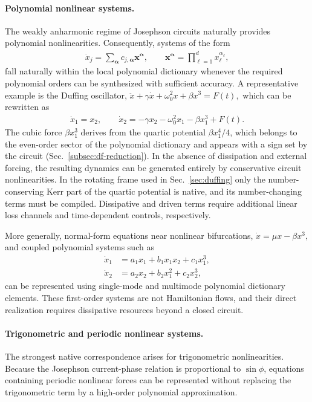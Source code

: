 \documentclass[pra,twocolumn,superscriptaddress,nofootinbib,floatfix]{revtex4-2}
\theoremstyle{remark}
\newcommand{\revcolor}{\color{blue}}
\DeclareRobustCommand{\rev}[1]{{\revcolor #1}}
\begin{document}
\paragraph{Polynomial nonlinear systems.}
The weakly anharmonic regime of Josephson circuits naturally provides polynomial nonlinearities. Consequently, systems of the form
\begin{align}
\dot x_j=\sum_{\boldsymbol{\alpha}}c_{j,\boldsymbol{\alpha}}\mathbf x^{\boldsymbol{\alpha}},\qquad\mathbf x^{\boldsymbol{\alpha}}=\prod_{\ell=1}^{d}x_{\ell}^{\alpha_{\ell}},
\label{eq:polynomial-vector-field}
\end{align}
fall naturally within the local polynomial dictionary whenever the required polynomial orders can be synthesized with sufficient accuracy. A representative example is the Duffing oscillator, \(\ddot x+\gamma\dot x+\omega_0^2x+\beta x^3=F(t),\) which can be rewritten as
\begin{align}
\dot x_1 = x_2,\qquad\dot x_2 =-\gamma x_2-\omega_0^2x_1-\beta x_1^3+F(t).
\end{align}
\rev{The cubic force \(\beta x_1^3\) derives from the quartic potential \(\beta x_1^4/4\), which belongs to the even-order sector of the polynomial dictionary and appears with a sign set by the circuit (Sec.~\ref{subsec:df-reduction}).} In the absence of dissipation and external forcing, the resulting dynamics can be generated entirely by conservative circuit nonlinearities. \rev{In the rotating frame used in Sec.~\ref{sec:duffing} only the number-conserving Kerr part of the quartic potential is native, and its number-changing terms must be compiled.} Dissipative and driven terms require additional linear loss channels and time-dependent controls, respectively.

More generally, normal-form equations near nonlinear bifurcations, \(\dot x=\mu x-\beta x^3,\) and coupled polynomial systems such as
\begin{align}
\dot x_1&=a_1x_1+b_1x_1x_2+c_1x_1^3,\nonumber\\
\dot x_2&=a_2x_2+b_2x_1^2+c_2x_2^3,
\end{align}
can be represented using single-mode and multimode polynomial dictionary elements. \rev{These first-order systems are not Hamiltonian flows, and their direct realization requires dissipative resources beyond a closed circuit.}

\paragraph{Trigonometric and periodic nonlinear systems.}
The strongest native correspondence arises for trigonometric nonlinearities. Because the Josephson current-phase relation is proportional to \(\sin\phi\), equations containing periodic nonlinear forces can be represented without replacing the trigonometric term by a high-order polynomial approximation.
\end{document}
